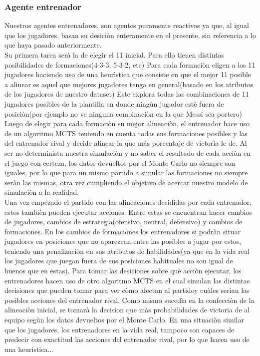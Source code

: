 \documentclass{article}
\begin{document}
    \subsubsection{Agente entrenador}
    Nuestros agentes entrenadores, son agentes puramente reactivos ya que, al igual que los jugadores, basan su desiciòn enteramente en el presente, sin referencia a lo que haya pasado anteriormente.\\ 

    Su primera tarea serà la de elegir el 11 inicial. Para ello tienen distintas posibilidades de formaciones(4-3-3, 5-3-2, etc) Para cada formaciòn eligen a los 11 jugadores haciendo uso de una heurìstica que consiste en que el mejor 11 posible a alinear es aquel que mejores jugadores tenga en general(basado en los atributos de los jugadores de nuestro dataset) Este explora todas las combinaciones de 11 jugadores posibles de la plantilla en donde ningùn jugador estè fuera de posiciòn(por ejemplo no ve ninguna combinaciòn en la que Messi sea portero) Luego de elegir para cada formaciòn su mejor alineaciòn, el entrenador hace uso de un algoritmo MCTS teniendo en cuenta todas sus formaciones posibles y las del entrenador rival y decide alinear la que màs porcentaje de victoria le de. Al ser no determinista nuestra simulaciòn y no saber el resultado de cada acciòn en el juego con certeza, los datos devueltos por el Monte Carlo no siempre son iguales, por lo que para un mismo partido a simular las formaciones no siempre seràn las mismas, otra vez cumpliendo el objetivo de acercar nuestro modelo de simulaciòn a la realidad.\\

    Una vez empezado el partido con las alineaciones decididas por cada entrenador, estos tambièn pueden ejecutar acciones. Entre estas se encuentran hacer cambios de jugadores, cambios de estrategia(ofensivo, neutral, defensivo) y cambios de formaciones. En los cambios de formaciones los entrenadores si podràn situar jugadores en posiciones que no aparezcan entre las posibles a jugar por estos, teniendo una penalizaciòn en sus atributos de habilidades(ya que en la vida real los jugadores que juegan fuera de sus posiciones habituales no son igual de buenos que en estas). Para tomar las desiciones sobre què acciòn ejecutar, los entrenadores hacen uso de otro algoritmo MCTS en el cual simulan las distintas decisiones que pueden tomar para ver còmo afectan al partidoy cuàles serìan las posibles acciones del entrenador rival. Como mismo sucedìa en la confecciòn de la alineaciòn inicial, se tomarà la decision que màs probabilidades de victoria de al equipo segùn los datos devueltos por el Monte Carlo. En una situaciòn similar que los jugadores, los entrenadores en la vida real, tampoco son capaces de predecir con exactitud las acciones del entrenador rival, por lo que hacen uso de una heurìstica...\\
\end{document}
